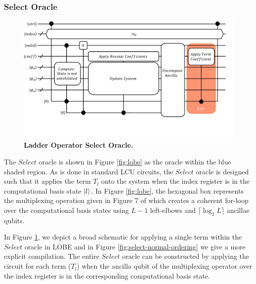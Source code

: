 \subsubsection{Select Oracle}
\label{subsubsec:select}

\begin{figure}
    \centering
    \includegraphics[width=16cm]{figures/select-broad.pdf}
    \caption{\textbf{Ladder Operator Select Oracle.}
    }
    \label{fig:select-broad}
\end{figure}

The $Select$ oracle is shown in Figure \ref{fig:lobe} as the oracle within the blue shaded region.
As is done in standard LCU circuits, the $Select$ oracle is designed such that it applies the term $T_l$ onto the system when the index register is in the computational basis state $\ket{l}$.
In Figure \ref{fig:lobe}, the hexagonal box represents the multiplexing operation given in Figure 7 of \cite{babbush2018encoding} which creates a coherent for-loop over the computational basis states using $L - 1$ left-elbows and $\lceil \log_2{L} \rceil$ ancillae qubits.

In Figure \ref{fig:select-broad}, we depict a broad schematic for applying a single term within the $Select$ oracle in LOBE and in Figure \ref{fig:select-normal-ordering} we give a more explicit compilation.
The entire $Select$ oracle can be constructed by applying the circuit for each term ($T_l$) when the ancilla qubit of the multiplexing operator over the index register is in the corresponding computational basis state.

